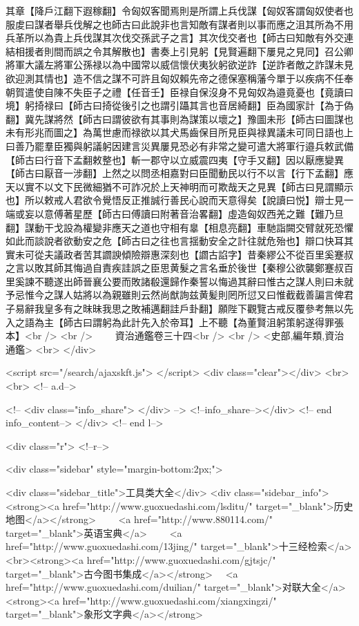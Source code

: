 其章【降戶江翻下遐稼翻】令匈奴客聞焉則是所謂上兵伐謀【匈奴客謂匈奴使者也服䖍曰謀者舉兵伐解之也師古曰此說非也言知敵有謀者則以事而應之沮其所為不用兵革所以為貴上兵伐謀其次伐交孫武子之言】其次伐交者也【師古曰知敵有外交連結相援者則間而誤之令其解散也】書奏上引見躬【見賢遍翻下屢見之見同】召公卿將軍大議左將軍公孫禄以為中國常以威信懷伏夷狄躬欲逆詐【逆詐者敵之詐謀未見欲迎測其情也】造不信之謀不可許且匈奴賴先帝之德保塞稱藩今單于以疾病不任奉朝賀遣使自陳不失臣子之禮【任音壬】臣禄自保沒身不見匈奴為邉竟憂也【竟讀曰境】躬掎禄曰【師古曰掎從後引之也謂引躡其言也音居綺翻】臣為國家計【為于偽翻】冀先謀將然【師古曰謂彼欲有其事則為謀策以壞之】豫圖未形【師古曰圖謀也未有形兆而圖之】為萬世慮而禄欲以其犬馬齒保目所見臣與禄異議未可同日語也上曰善乃罷羣臣獨與躬議躬因建言災異屢見恐必有非常之變可遣大將軍行邉兵敕武備【師古曰行音下孟翻敕整也】斬一郡守以立威震四夷【守手又翻】因以厭應變異【師古曰厭音一涉翻】上然之以問丞相嘉對曰臣聞動民以行不以言【行下孟翻】應天以實不以文下民微細猶不可詐况於上天神明而可欺哉天之見異【師古曰見謂顯示也】所以敕戒人君欲令覺悟反正推誠行善民心說而天意得矣【說讀曰悦】辯士見一端或妄以意傅著星歷【師古曰傅讀曰附著音治畧翻】虛造匈奴西羌之難【難乃旦翻】謀動干戈設為權變非應天之道也守相有辠【相息亮翻】車馳詣闕交臂就死恐懼如此而談說者欲動安之危【師古曰之往也言揺動安全之計往就危殆也】辯口快耳其實未可從夫議政者苦其讇諛傾險辯惠深刻也【讇古諂字】昔秦繆公不從百里奚蹇叔之言以敗其師其悔過自責疾詿誤之臣思黄髮之言名垂於後世【秦穆公欲襲鄭蹇叔百里奚諫不聽遂出師晉襄公要而敗諸殽還歸作秦誓以悔過其辭曰惟古之謀人則曰未就予忌惟今之謀人姑將以為親雖則云然尚猷詢兹黄髪則罔所愆又曰惟截截善諞言俾君子易辭我皇多有之昩昧我思之敗補邁翻詿戶卦翻】願陛下觀覽古戒反覆參考無以先入之語為主【師古曰謂躬為此計先入於帝耳】上不聽【為董賢沮躬策躬遂得罪張本】<br />
<br />
　　資治通鑑卷三十四<br />
<br />
<史部,編年類,資治通鑑>  <br>
   </div> 

<script src="/search/ajaxskft.js"> </script>
 <div class="clear"></div>
<br>
<br>
 <!-- a.d-->

 <!--
<div class="info_share">
</div> 
-->
 <!--info_share--></div>   <!-- end info_content-->
  </div> <!-- end l-->

<div class="r">   <!--r-->



<div class="sidebar"  style="margin-bottom:2px;">

 
<div class="sidebar_title">工具类大全</div>
<div class="sidebar_info">
<strong><a href="http://www.guoxuedashi.com/lsditu/" target="_blank">历史地图</a></strong>　　
<a href="http://www.880114.com/" target="_blank">英语宝典</a>　　
<a href="http://www.guoxuedashi.com/13jing/" target="_blank">十三经检索</a>　
<br><strong><a href="http://www.guoxuedashi.com/gjtsjc/" target="_blank">古今图书集成</a></strong>　
<a href="http://www.guoxuedashi.com/duilian/" target="_blank">对联大全</a>　<strong><a href="http://www.guoxuedashi.com/xiangxingzi/" target="_blank">象形文字典</a></strong>　

